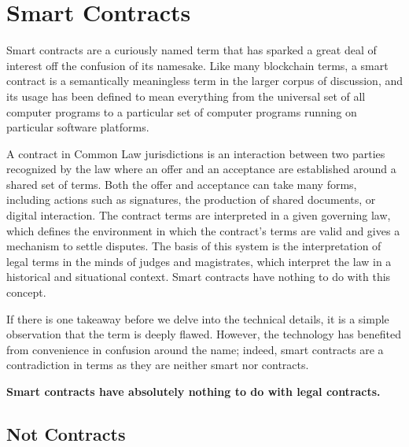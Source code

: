 \chapter{Smart Contracts}


Smart contracts are a curiously named term that has sparked a great deal of
interest off the confusion of its namesake. Like many blockchain terms, a smart
contract is a semantically meaningless term in the larger corpus of discussion,
and its usage has been defined to mean everything from the universal set of all
computer programs to a particular set of computer programs running on particular
software platforms.

A contract in Common Law jurisdictions is an interaction between two parties
recognized by the law where an offer and an acceptance are established around a
shared set of terms. Both the offer and acceptance can take many forms,
including actions such as signatures, the production of shared documents, or
digital interaction. The contract terms are interpreted in a given governing
law, which defines the environment in which the contract's terms are valid and
gives a mechanism to settle disputes. The basis of this system is the
interpretation of legal terms in the minds of judges and magistrates, which
interpret the law in a historical and situational context. Smart contracts have
nothing to do with this concept.

If there is one takeaway before we delve into the technical details, it is a
simple observation that the term is deeply flawed. However, the technology has
benefited from convenience in confusion around the name; indeed, smart contracts
are a contradiction in terms as they are neither smart nor contracts.

\begin{infobox}
  \textbf{
    Smart contracts have absolutely nothing to do with legal contracts.
  }
\end{infobox}

\section{Not Contracts}

